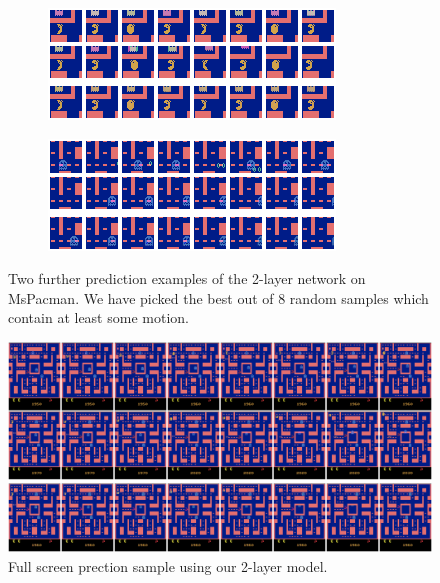 \begin{figure}[h!tb]
\centering
\begin{subfigure}{0.49\textwidth}
  \centering
  \includegraphics[width=0.92\linewidth]{figures/pred/pac/random/pred-01.png}
  \caption{}
  \label{fig:pac-pred-random_extra1}
\end{subfigure}%
\begin{subfigure}{0.49\textwidth}
  \centering
  \includegraphics[width=0.92\linewidth]{figures/pred/pac/random/pred-02.png}
  \caption{}
  \label{fig:pac-pred-random_extra2}
\end{subfigure}
\caption[Prediction Samples on MsPacman]{Two further prediction examples of the 2-layer network on MsPacman. We have picked the best out of 8 random samples which contain at least some motion.} \label{fig:pac-pred-random_extra}
\end{figure}

\begin{figure}[htpb]
	\centering
	\includegraphics[width=1.0\linewidth]{figures/pred/pac/full/pred-01.png} 
	\caption[Full Screen Prediction on MsPacman]{Full screen prection sample using our 2-layer model.} \label{fig:pac-pred-full2}
\end{figure}

